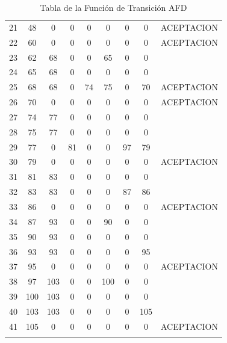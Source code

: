 \begin{longtable}{||c|c||cccccc||c||}
21 & 48        & 0     & 0  & 0  & 0     & 0     & 0     & ACEPTACION  \\
22 & 60        & 0     & 0  & 0  & 0     & 0     & 0     & ACEPTACION  \\
23 & 62        & 68    & 0  & 0  & 65    & 0     & 0     &             \\
24 & 65        & 68    & 0  & 0  & 0     & 0     & 0     &             \\
25 & 68        & 68    & 0  & 74 & 75    & 0     & 70    & ACEPTACION  \\
26 & 70        & 0     & 0  & 0  & 0     & 0     & 0     & ACEPTACION  \\
27 & 74        & 77    & 0  & 0  & 0     & 0     & 0     &             \\
28 & 75        & 77    & 0  & 0  & 0     & 0     & 0     &             \\
29 & 77        & 0     & 81 & 0  & 0     & 97    & 79    &             \\
30 & 79        & 0     & 0  & 0  & 0     & 0     & 0     & ACEPTACION  \\
31 & 81        & 83    & 0  & 0  & 0     & 0     & 0     &             \\
32 & 83        & 83    & 0  & 0  & 0     & 87    & 86    &             \\
33 & 86        & 0     & 0  & 0  & 0     & 0     & 0     & ACEPTACION  \\
34 & 87        & 93    & 0  & 0  & 90    & 0     & 0     &             \\
35 & 90        & 93    & 0  & 0  & 0     & 0     & 0     &             \\
36 & 93        & 93    & 0  & 0  & 0     & 0     & 95    &             \\
37 & 95        & 0     & 0  & 0  & 0     & 0     & 0     & ACEPTACION  \\
38 & 97        & 103   & 0  & 0  & 100   & 0     & 0     &             \\
39 & 100       & 103   & 0  & 0  & 0     & 0     & 0     &             \\
40 & 103       & 103   & 0  & 0  & 0     & 0     & 105   &             \\
41 & 105       & 0     & 0  & 0  & 0     & 0     & 0     & ACEPTACION  \\
\hline
\hline

\caption{Tabla de la Función de Transición AFD}
\label{AFDnumeros}
\end{longtable}


